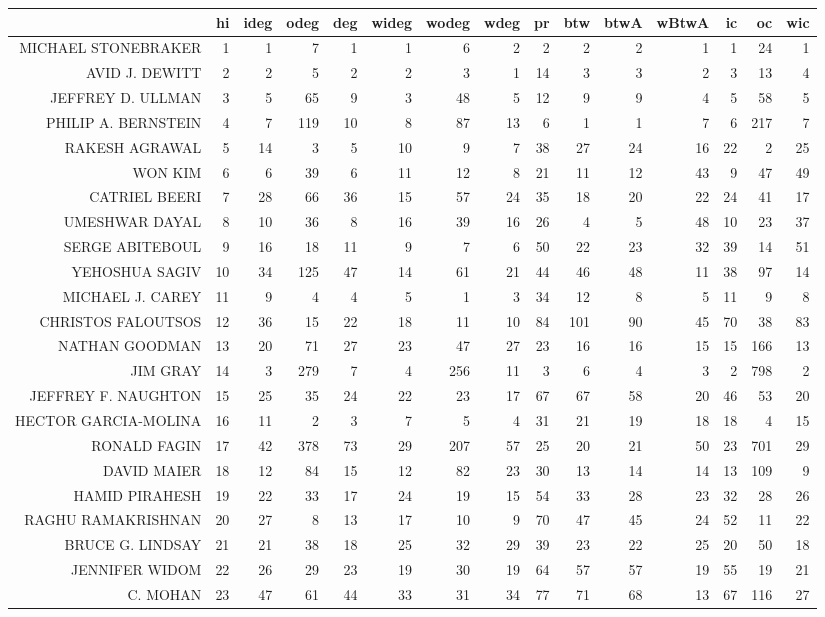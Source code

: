 \documentclass{bakalarka}
\begin{document}
\begin{table}[!ht]
\centering
\begin{sideways}
\begin{scriptsize}
\begin{tabular}{r|r|rrrrrrrrrrrrr}
\toprule
&hi&ideg&odeg&deg&wideg&wodeg&wdeg&pr&btw&btwA&wBtwA&ic&oc&wic\\
\midrule
MICHAEL STONEBRAKER&1&1&7&1&1&6&2&2&2&2&1&1&24&1\\
AVID J. DEWITT&2&2&5&2&2&3&1&14&3&3&2&3&13&4\\
JEFFREY D. ULLMAN&3&5&65&9&3&48&5&12&9&9&4&5&58&5\\
PHILIP A. BERNSTEIN&4&7&119&10&8&87&13&6&1&1&7&6&217&7\\
RAKESH AGRAWAL&5&14&3&5&10&9&7&38&27&24&16&22&2&25\\
WON KIM&6&6&39&6&11&12&8&21&11&12&43&9&47&49\\
CATRIEL BEERI&7&28&66&36&15&57&24&35&18&20&22&24&41&17\\
UMESHWAR DAYAL&8&10&36&8&16&39&16&26&4&5&48&10&23&37\\
SERGE ABITEBOUL&9&16&18&11&9&7&6&50&22&23&32&39&14&51\\
YEHOSHUA SAGIV&10&34&125&47&14&61&21&44&46&48&11&38&97&14\\
MICHAEL J. CAREY&11&9&4&4&5&1&3&34&12&8&5&11&9&8\\
CHRISTOS FALOUTSOS&12&36&15&22&18&11&10&84&101&90&45&70&38&83\\
NATHAN GOODMAN&13&20&71&27&23&47&27&23&16&16&15&15&166&13\\
JIM GRAY&14&3&279&7&4&256&11&3&6&4&3&2&798&2\\
JEFFREY F. NAUGHTON&15&25&35&24&22&23&17&67&67&58&20&46&53&20\\
HECTOR GARCIA-MOLINA&16&11&2&3&7&5&4&31&21&19&18&18&4&15\\
RONALD FAGIN&17&42&378&73&29&207&57&25&20&21&50&23&701&29\\
DAVID MAIER&18&12&84&15&12&82&23&30&13&14&14&13&109&9\\
HAMID PIRAHESH&19&22&33&17&24&19&15&54&33&28&23&32&28&26\\
RAGHU RAMAKRISHNAN&20&27&8&13&17&10&9&70&47&45&24&52&11&22\\
BRUCE G. LINDSAY&21&21&38&18&25&32&29&39&23&22&25&20&50&18\\
JENNIFER WIDOM&22&26&29&23&19&30&19&64&57&57&19&55&19&21\\
C. MOHAN&23&47&61&44&33&31&34&77&71&68&13&67&116&27\\

\end{tabular}
\end{scriptsize}
\end{sideways}
\end{table}
\end{document}
